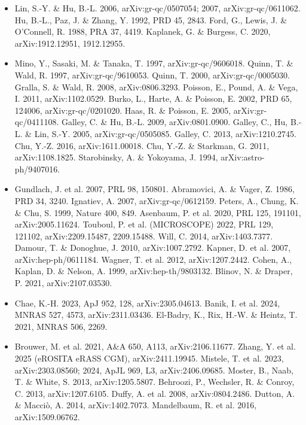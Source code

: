 \documentclass[11pt,a4paper]{article}
\begin{document}
\begin{itemize}
\item Lin, S.-Y. \& Hu, B.-L. 2006, arXiv:gr-qc/0507054; 2007, arXiv:gr-qc/0611062. Hu, B.-L., Paz, J. \& Zhang, Y. 1992, PRD 45, 2843. Ford, G., Lewis, J. \& O'Connell, R. 1988, PRA 37, 4419. Kaplanek, G. \& Burgess, C. 2020, arXiv:1912.12951, 1912.12955.

\item Mino, Y., Sasaki, M. \& Tanaka, T. 1997, arXiv:gr-qc/9606018. Quinn, T. \& Wald, R. 1997, arXiv:gr-qc/9610053. Quinn, T. 2000, arXiv:gr-qc/0005030. Gralla, S. \& Wald, R. 2008, arXiv:0806.3293. Poisson, E., Pound, A. \& Vega, I. 2011, arXiv:1102.0529. Burko, L., Harte, A. \& Poisson, E. 2002, PRD 65, 124006, arXiv:gr-qc/0201020. Haas, R. \& Poisson, E. 2005, arXiv:gr-qc/0411108. Galley, C. \& Hu, B.-L. 2009, arXiv:0801.0900. Galley, C., Hu, B.-L. \& Lin, S.-Y. 2005, arXiv:gr-qc/0505085. Galley, C. 2013, arXiv:1210.2745. Chu, Y.-Z. 2016, arXiv:1611.00018. Chu, Y.-Z. \& Starkman, G. 2011, arXiv:1108.1825. Starobinsky, A. \& Yokoyama, J. 1994, arXiv:astro-ph/9407016.

\item Gundlach, J. et al. 2007, PRL 98, 150801. Abramovici, A. \& Vager, Z. 1986, PRD 34, 3240. Ignatiev, A. 2007, arXiv:gr-qc/0612159. Peters, A., Chung, K. \& Chu, S. 1999, Nature 400, 849. Asenbaum, P. et al. 2020, PRL 125, 191101, arXiv:2005.11624. Touboul, P. et al. (MICROSCOPE) 2022, PRL 129, 121102, arXiv:2209.15487, 2209.15488. Will, C. 2014, arXiv:1403.7377. Damour, T. \& Donoghue, J. 2010, arXiv:1007.2792. Kapner, D. et al. 2007, arXiv:hep-ph/0611184. Wagner, T. et al. 2012, arXiv:1207.2442. Cohen, A., Kaplan, D. \& Nelson, A. 1999, arXiv:hep-th/9803132. Blinov, N. \& Draper, P. 2021, arXiv:2107.03530.

\item Chae, K.-H. 2023, ApJ 952, 128, arXiv:2305.04613. Banik, I. et al. 2024, MNRAS 527, 4573, arXiv:2311.03436. El-Badry, K., Rix, H.-W. \& Heintz, T. 2021, MNRAS 506, 2269.

\item Brouwer, M. et al. 2021, A\&A 650, A113, arXiv:2106.11677. Zhang, Y. et al. 2025 (eROSITA eRASS CGM), arXiv:2411.19945. Mistele, T. et al. 2023, arXiv:2303.08560; 2024, ApJL 969, L3, arXiv:2406.09685. Moster, B., Naab, T. \& White, S. 2013, arXiv:1205.5807. Behroozi, P., Wechsler, R. \& Conroy, C. 2013, arXiv:1207.6105. Duffy, A. et al. 2008, arXiv:0804.2486. Dutton, A. \& Macci\`o, A. 2014, arXiv:1402.7073. Mandelbaum, R. et al. 2016, arXiv:1509.06762.


\end{itemize}
\end{document}
